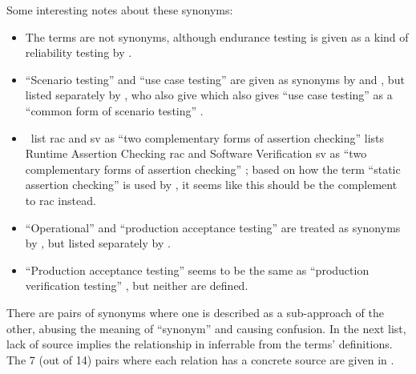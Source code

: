 \begin{enumerate}
      \ifnotpaper  \else  \fi
\end{enumerate}

\ifnotpaper
      Some interesting notes about these synonyms:
      \begin{itemize}
            \item The terms are not synonyms, although endurance testing is given
                  as a kind of reliability testing by \citet[p.~55]{Firesmith2015}.
            \item ``Scenario testing'' and ``use case testing'' are given as synonyms
                  by \citetISTQB{} and \citet[pp.~47-49]{Kam2008}, but listed
                  separately by \citet[p.~22]{IEEE2022},
                  \ifnotpaper who also give \else which also gives \fi ``use case
                  testing'' as a ``common form of scenario testing''
                  \citeyearpar[p.~20]{IEEE2021}.
            \item \ifnotpaper
                        \citeauthor{ChalinEtAl2006}~list \acf{rac} and \acf{sv} as ``two
                        complementary forms of assertion checking''
                        \citeyearpar[p.~343]{ChalinEtAl2006}%
                  \else
                        \cite[p.~343]{ChalinEtAl2006} lists Runtime Assertion
                        Checking \acf{rac} and Software Verification \acf{sv} as
                        ``two complementary forms of assertion checking''%
                  \fi; based on how the term ``static
                  assertion checking'' is used by \citet[p.~345]{LahiriEtAl2013}, it
                  seems like this should be the complement to \acs{rac} instead.
            \item ``Operational'' and ``production acceptance testing'' are treated
                  as synonyms by \citetISTQB{}, but listed separately by
                  \citet[p.~30]{Firesmith2015}.
            \item ``Production acceptance testing'' \citep[p.~30]{Firesmith2015}
                  seems to be the same as ``production verification testing''
                  \citep[p.~22]{IEEE2022}, but neither are defined.
      \end{itemize}
\fi

There are pairs of synonyms where one is described as a
sub-approach of the other, abusing the meaning of ``synonym'' and
causing confusion.
\ifnotpaper In the next list, lack of source implies the relationship
      in inferrable from the terms' definitions.
\else The 7 (out of 14) pairs where each relation has a concrete
      source are given in .
\fi

